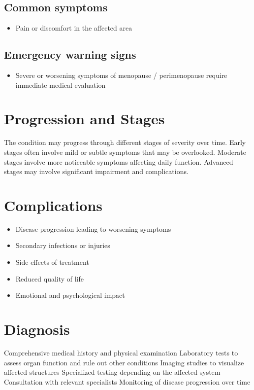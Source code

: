\subsection{Common symptoms}
\begin{itemize}[noitemsep]
  \item Pain or discomfort in the affected area
  \end{itemize}

\subsection{Emergency warning signs}
\begin{itemize}[noitemsep]
  \item Severe or worsening symptoms of menopause / perimenopause require immediate medical evaluation
\end{itemize}
\section{Progression and Stages}
The condition may progress through different stages of severity over time. Early stages often involve mild or subtle symptoms that may be overlooked. Moderate stages involve more noticeable symptoms affecting daily function. Advanced stages may involve significant impairment and complications.
\section{Complications}
\begin{itemize}[noitemsep]
  \item Disease progression leading to worsening symptoms
  \item Secondary infections or injuries
  \item Side effects of treatment
  \item Reduced quality of life
  \item Emotional and psychological impact
\end{itemize}
\section{Diagnosis}
Comprehensive medical history and physical examination Laboratory tests to assess organ function and rule out other conditions Imaging studies to visualize affected structures Specialized testing depending on the affected system Consultation with relevant specialists Monitoring of disease progression over time

